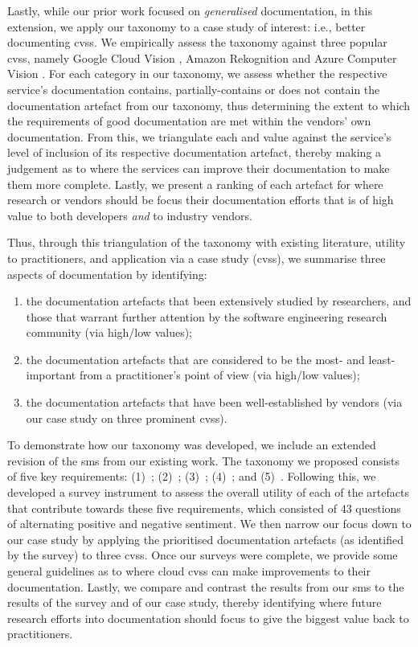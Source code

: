 Lastly, while our prior work focused on \textit{generalised}  documentation, in this extension, we apply our taxonomy to a case study of interest: i.e., better documenting \glspl{cvs}. We empirically assess the taxonomy against three popular \glspl{cvs}, namely Google Cloud Vision , Amazon Rekognition  and Azure Computer Vision . For each category in our taxonomy, we assess whether the respective service's documentation contains, partially-contains or does not contain the documentation artefact from our taxonomy, thus determining the extent to which the requirements of good  documentation are met within the vendors' own documentation.
From this, we triangulate each  and  value against the service's level of inclusion of its respective documentation artefact, thereby making a judgement as to where the services can improve their documentation to make them more complete. Lastly, we present a ranking of each artefact for where research or vendors should be focus their documentation efforts that is of high value to both developers \textit{and} to industry vendors.

Thus, through this triangulation of the taxonomy with existing literature, utility to practitioners, and application via a case study (\glspl{cvs}), we summarise three aspects of  documentation by identifying:
\begin{enumerate}[label=(\roman*)]
    \item the documentation artefacts that been extensively studied by researchers, and those that warrant further attention by the software engineering research community (via high/low  values);
    \item the documentation artefacts that are considered to be the most- and least-important from a practitioner's point of view (via high/low  values);
    \item the documentation artefacts that have been well-established by vendors (via our case study on three prominent \glspl{cvs}).
\end{enumerate}

To demonstrate how our taxonomy was developed, we include an extended revision of the \gls{sms} from our existing work. The taxonomy we proposed consists of five key requirements: (1)~\dima{}; (2)~\dimb{}; (3)~\dimc{}; (4)~\dimd{}; and (5)~\dime{}. Following this, we developed a survey instrument to assess the overall utility of each of the artefacts that contribute towards these five requirements, which consisted of 43 questions of alternating positive and negative sentiment.
We then narrow our focus down to our case study by applying the prioritised documentation artefacts (as identified by the survey) to three \glspl{cvs}. Once our surveys were complete, we provide some general guidelines as to where cloud \glspl{cvs} can make improvements to their  documentation. Lastly, we compare and contrast the results from our \gls{sms} to the results of the survey and of our case study, thereby identifying where future research efforts into  documentation should focus to give the biggest value back to practitioners.

